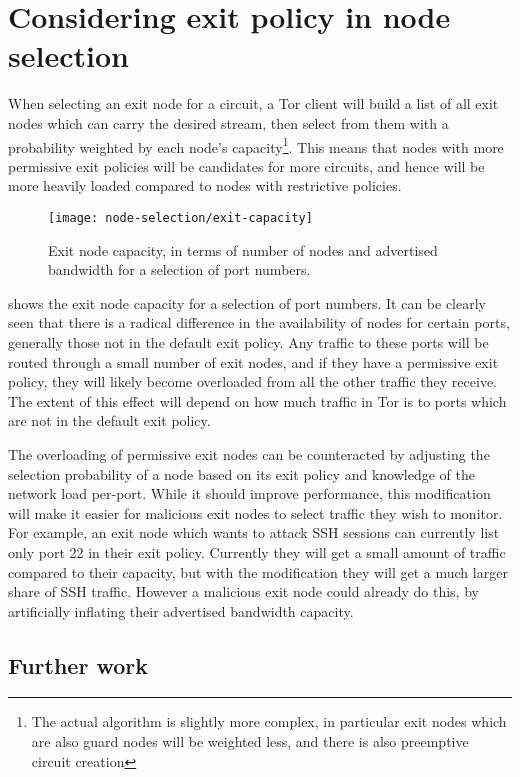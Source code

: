 \documentclass{article}
\begin{document}
\section{Considering exit policy in node selection}

When selecting an exit node for a circuit, a Tor client will build a list of all exit nodes which can carry the desired stream, then select from them with a probability weighted by each node's capacity\footnote{The actual algorithm is slightly more complex, in particular exit nodes which are also guard nodes will be weighted less, and there is also preemptive circuit creation}.
This means that nodes with more permissive exit policies will be candidates for more circuits, and hence will be more heavily loaded compared to nodes with restrictive policies.

\begin{figure}
\texttt{[image: node-selection/exit-capacity]}
\caption{Exit node capacity, in terms of number of nodes and advertised bandwidth for a selection of port numbers.}
\label{fig:exit-capacity}
\end{figure}

 shows the exit node capacity for a selection of port numbers.
It can be clearly seen that there is a radical difference in the availability of nodes for certain ports, generally those not in the default exit policy.
Any traffic to these ports will be routed through a small number of exit nodes, and if they have a permissive exit policy, they will likely become overloaded from all the other traffic they receive.
The extent of this effect will depend on how much traffic in Tor is to ports which are not in the default exit policy.

The overloading of permissive exit nodes can be counteracted by adjusting the selection probability of a node based on its exit policy and knowledge of the network load per-port.
While it should improve performance, this modification will make it easier for malicious exit nodes to select traffic they wish to monitor.
For example, an exit node which wants to attack SSH sessions can currently list only port 22 in their exit policy.
Currently they will get a small amount of traffic compared to their capacity, but with the modification they will get a much larger share of SSH traffic.
However a malicious exit node could already do this, by artificially inflating their advertised bandwidth capacity.

\subsection{Further work}
\end{document}
